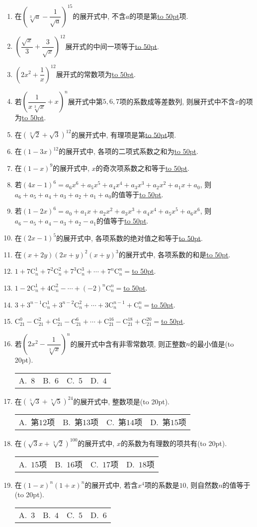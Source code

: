\documentclass[10pt,a4paper]{article}
\newcommand{\blank}[1]{\underline{\hbox to #1pt{}}}
\newcommand{\bracket}[1]{(\hbox to #1pt{})}
\newcommand{\fourch}[4]{\par\begin{tabular}{p{.23\textwidth}p{.23\textwidth}p{.23\textwidth}p{.23\textwidth}}
A.~#1 &B.~#2& C.~#3& D.~#4
\end{tabular}}
\begin{document}
\begin{enumerate}[1.]
\item 在$(\sqrt[3]a-\dfrac 1{\sqrt a})^{15}$的展开式中, 不含$a$的项是第\blank{50}项.
\item $(\dfrac{\sqrt x}3+\dfrac 3{\sqrt x})^{12}$展开式的中间一项等于\blank{50}.
\item $(2x^2+\dfrac 1x)^{12}$展开式的常数项为\blank{50}.
\item 若$(\dfrac 1{x\sqrt[3]x}+x)^n$展开式中第$5, 6, 7$项的系数成等差数列, 则展开式中不含$x$的项为\blank{50}.
\item 在$(\sqrt[3]2+\sqrt 3)^{12}$的展开式中, 有理项是第\blank{50}项.
\item 在$(1-3x)^{12}$的展开式中, 各项的二项式系数之和为\blank{50}.
\item 在$(1-x)^9$的展开式中, $x$的奇次项系数之和等于\blank{50}.
\item 若$(4x-1)^6=a_6x^6+a_5x^5+a_4x^4+a_3x^3+a_2x^2+a_1x+a_0$, 则$a_6+a_5+a_4+a_3+a_2+a_1+a_0$的值等于\blank{50}.
\item 若$(1-2x)^6=a_0+a_1x+a_2x^2+a_3x^3+a_4x^4+a_5x^5+a_6x^6$, 则$a_6-a_5+a_4-a_3+a_2-a_1$的值等于\blank{50}.
\item 在$(2x-1)^5$的展开式中, 各项系数的绝对值之和等于\blank{50}.
\item 在$(x+2y)(2x+y)^2(x+y)^3$的展开式中, 各项系数的和是\blank{50}.
\item $1+7\mathrm{C}_n^1+7^2\mathrm{C}_n^2+7^3\mathrm{C}_n^3+\cdots+7^n\mathrm{C}_n^n=$\blank{50}.
\item $1-2\mathrm{C}_n^1+4\mathrm{C}_n^2-\cdots +(-2)^n\mathrm{C}_n^n=$\blank{50}.
\item $3+3^{n-1}\mathrm{C}_n^1+3^{n-2}\mathrm{C}_n^2+\cdots +3\mathrm{C}_n^{n-1}+\mathrm{C}_n^n=$\blank{50}.
\item $\mathrm{C}_{21}^0-\mathrm{C}_{21}^2+\mathrm{C}_{21}^4-\mathrm{C}_{21}^6+\cdots +\mathrm{C}_{21}^{16}-\mathrm{C}_{21}^{18}+\mathrm{C}_{21}^{20}=$\blank{50}.
\item 若$(2x^2-\dfrac 1{\sqrt[3]x})^n$的展开式中含有非零常数项, 则正整数$n$的最小值是\bracket{20}.
\fourch{$8$}{$6$}{$5$}{$4$}
\item 在$(\sqrt[5]3+\sqrt[7]5)^{24}$的展开式中, 整数项是\bracket{20}.
\fourch{第$12$项}{第$13$项}{第$14$项}{第$15$项}
\item 在$(\sqrt 3x+\sqrt[3]2)^{100}$的展开式中, $x$的系数为有理数的项共有\bracket{20}.
\fourch{$15$项}{$16$项}{$17$项}{$18$项}
\item 在$(1-x)^n(1+x)^n$的展开式中, 若含$x^4$项的系数是$10$, 则自然数$n$的值等于\bracket{20}.
\fourch{$3$}{$4$}{$5$}{$6$}

\end{enumerate}
\end{document}
